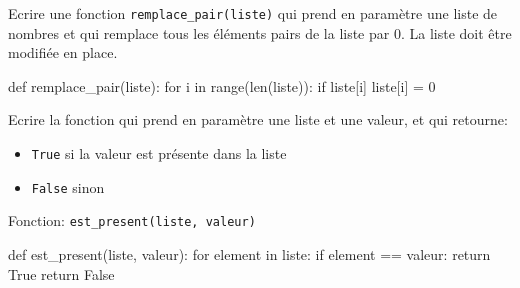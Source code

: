 \documentclass[11pt, a4paper]{report}
\begin{document}
    \begin{minipage}{0.48\linewidth}
        \begin{exercice_cours}
        Ecrire une fonction \verb|remplace_pair(liste)| qui prend en paramètre une liste de nombres et qui remplace tous les éléments pairs de la liste par 0. La liste doit être modifiée en place.
    \end{exercice_cours}

    \end{minipage}\hfill
    \begin{minipage}{0.48\linewidth}
\begin{blocvisible}[height=3.]
    \begin{CodePythontexAlt}[TaillePolice=\large, Largeur=1\linewidth,Centre,Lignes=true,PremLigne=1]{}
def remplace_pair(liste):
    for i in range(len(liste)):
        if liste[i] %
            liste[i] = 0
    \end{CodePythontexAlt}
\end{blocvisible}
    \end{minipage}

    
    \begin{minipage}{0.48\linewidth}
        \begin{exercice_cours}

Ecrire la fonction  qui prend en paramètre une liste et une valeur, et qui retourne: 
\begin{itemize}
        \item \texttt{True} si la valeur est présente dans la liste
        \item \texttt{False} sinon 
    \end{itemize}

    Fonction: \verb|est_present(liste, valeur)|
    \end{exercice_cours}

    \end{minipage}\hfill
    \begin{minipage}{0.48\linewidth}
\begin{blocvisible}[height=4.]
    \begin{CodePythontexAlt}[TaillePolice=\large, Largeur=1\linewidth,Centre,Lignes=true,PremLigne=1]{}
def est_present(liste, valeur):
    for element in liste:
        if element == valeur:
            return True
    return False
    \end{CodePythontexAlt}
\end{blocvisible}


    \end{minipage}
\end{document}
